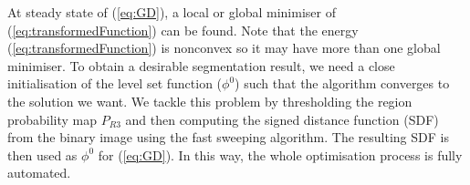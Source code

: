 \documentclass[runningheads,a4paper]{llncs}
\begin{document}
At steady state of (\ref{eq:GD}), a local or global minimiser of (\ref{eq:transformedFunction}) can be found. Note that the energy (\ref{eq:transformedFunction}) is nonconvex so it may have more than one global minimiser. To obtain a desirable segmentation result, we need a close initialisation of the level set function ($\phi^0$) such that the algorithm converges to the solution we want. We tackle this problem by thresholding the region probability map $P_{R3}$ and then computing the signed distance function (SDF) from the binary image using the fast sweeping algorithm. The resulting SDF is then used as $\phi^0$ for (\ref{eq:GD}). In this way, the whole optimisation process is fully automated. 
\end{document}
